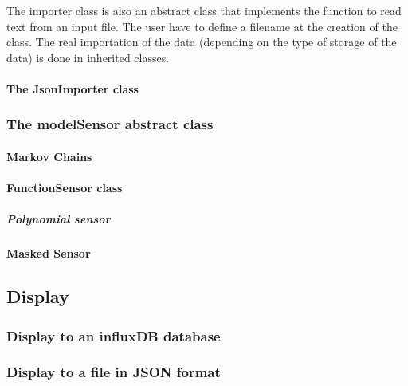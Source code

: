 The importer class is also an abstract class that implements the function to read text from an input file. The user have to define a filename at the creation of the class. The real importation of the data (depending on the type of storage of the data) is done in inherited classes.

\paragraph{The JsonImporter class}




\subsubsection{The modelSensor abstract class}

\paragraph{Markov Chains}

\paragraph{FunctionSensor class}

\subparagraph{Polynomial sensor}

\paragraph{Masked Sensor}




\subsection{Display}

\subsubsection{Display to an influxDB database}

\subsubsection{Display to a file in JSON format}
